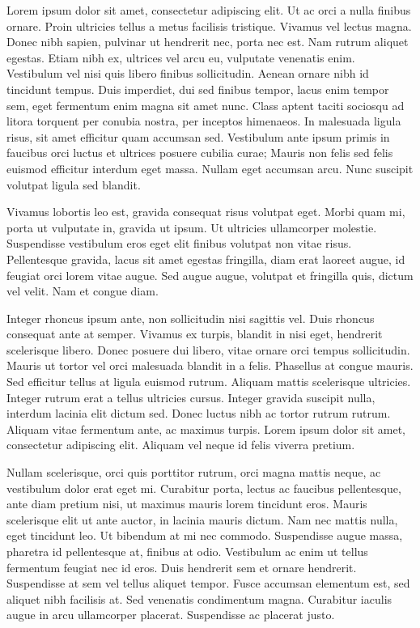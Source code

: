 \begin{abstracts}        %

Lorem ipsum dolor sit amet, consectetur adipiscing elit. Ut ac orci a nulla finibus ornare. Proin ultricies tellus a metus facilisis tristique. Vivamus vel lectus magna. Donec nibh sapien, pulvinar ut hendrerit nec, porta nec est. Nam rutrum aliquet egestas. Etiam nibh ex, ultrices vel arcu eu, vulputate venenatis enim. Vestibulum vel nisi quis libero finibus sollicitudin. Aenean ornare nibh id tincidunt tempus. Duis imperdiet, dui sed finibus tempor, lacus enim tempor sem, eget fermentum enim magna sit amet nunc. Class aptent taciti sociosqu ad litora torquent per conubia nostra, per inceptos himenaeos. In malesuada ligula risus, sit amet efficitur quam accumsan sed. Vestibulum ante ipsum primis in faucibus orci luctus et ultrices posuere cubilia curae; Mauris non felis sed felis euismod efficitur interdum eget massa. Nullam eget accumsan arcu. Nunc suscipit volutpat ligula sed blandit.

Vivamus lobortis leo est, gravida consequat risus volutpat eget. Morbi quam mi, porta ut vulputate in, gravida ut ipsum. Ut ultricies ullamcorper molestie. Suspendisse vestibulum eros eget elit finibus volutpat non vitae risus. Pellentesque gravida, lacus sit amet egestas fringilla, diam erat laoreet augue, id feugiat orci lorem vitae augue. Sed augue augue, volutpat et fringilla quis, dictum vel velit. Nam et congue diam.

Integer rhoncus ipsum ante, non sollicitudin nisi sagittis vel. Duis rhoncus consequat ante at semper. Vivamus ex turpis, blandit in nisi eget, hendrerit scelerisque libero. Donec posuere dui libero, vitae ornare orci tempus sollicitudin. Mauris ut tortor vel orci malesuada blandit in a felis. Phasellus at congue mauris. Sed efficitur tellus at ligula euismod rutrum. Aliquam mattis scelerisque ultricies. Integer rutrum erat a tellus ultricies cursus. Integer gravida suscipit nulla, interdum lacinia elit dictum sed. Donec luctus nibh ac tortor rutrum rutrum. Aliquam vitae fermentum ante, ac maximus turpis. Lorem ipsum dolor sit amet, consectetur adipiscing elit. Aliquam vel neque id felis viverra pretium.

Nullam scelerisque, orci quis porttitor rutrum, orci magna mattis neque, ac vestibulum dolor erat eget mi. Curabitur porta, lectus ac faucibus pellentesque, ante diam pretium nisi, ut maximus mauris lorem tincidunt eros. Mauris scelerisque elit ut ante auctor, in lacinia mauris dictum. Nam nec mattis nulla, eget tincidunt leo. Ut bibendum at mi nec commodo. Suspendisse augue massa, pharetra id pellentesque at, finibus at odio. Vestibulum ac enim ut tellus fermentum feugiat nec id eros. Duis hendrerit sem et ornare hendrerit. Suspendisse at sem vel tellus aliquet tempor. Fusce accumsan elementum est, sed aliquet nibh facilisis at. Sed venenatis condimentum magna. Curabitur iaculis augue in arcu ullamcorper placerat. Suspendisse ac placerat justo.


\end{abstracts}
